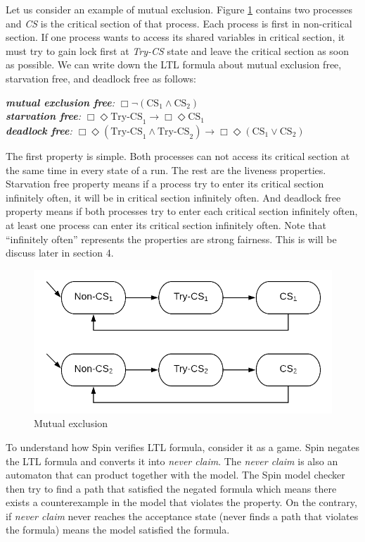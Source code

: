 Let us consider an example of mutual exclusion. Figure \ref{fig:mutex} contains two processes and \textit{CS} is the critical section of that process. Each process is first in non-critical section. If one process wants to access its shared variables in critical section, it must try to gain lock first at \textit{Try-CS} state and leave the critical section as soon as possible. We can write down the LTL formula about mutual exclusion free, starvation free, and deadlock free as follows:

{\medbreak\indent\textit{\textbf{mutual exclusion free}: $\Box\neg(\text{CS}_1\wedge\text{CS}_2)$}}
{\\\indent\textit{\textbf{starvation free}: $\Box\Diamond \text{Try-CS}_1\rightarrow\Box\Diamond\text{CS}_1$}}
{\\\indent\textit{\textbf{deadlock free}: $\Box\Diamond(\text{Try-CS}_1\wedge\text{Try-CS}_2)\rightarrow\Box\Diamond(\text{CS}_1\vee\text{CS}_2)$}}
\medbreak

The first property is simple. Both processes can not access its critical section at the same time in every state of a run. The rest are the liveness properties. Starvation free property means if a process try to enter its critical section infinitely often, it will be in critical section infinitely often. And deadlock free property means if both processes try to enter each critical section infinitely often, at least one process can enter its critical section infinitely often. Note that ``infinitely often'' represents the properties are strong fairness. This is will be discuss later in section 4.

\begin{figure}
\includegraphics[width=0.7\linewidth]{img/mutex}
\caption{Mutual exclusion}
\label{fig:mutex}
\end{figure}

To understand how Spin verifies LTL formula, consider it as a game. Spin negates the LTL formula and converts it into \textit{never claim}. The \textit{never claim} is also an automaton that can product together with the model. The Spin model checker then try to find a path that satisfied the negated formula which means there exists a counterexample in the model that violates the property. On the contrary, if \textit{never claim} never reaches the acceptance state (never finds a path that violates the formula) means the model satisfied the formula.

